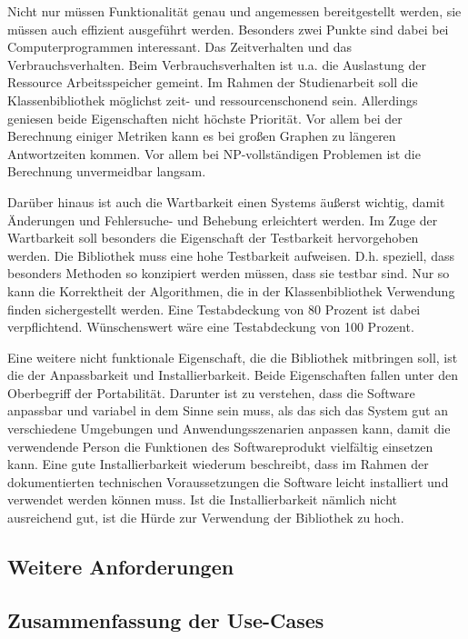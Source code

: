 \documentclass[a4paper,12pt,ngerman,chapterprefix=false,listof=totoc,bibliography=totoc]{scrreprt}
\begin{document}
{{{Nicht nur müssen Funktionalität genau und angemessen bereitgestellt werden, sie müssen auch effizient ausgeführt werden. Besonders zwei Punkte sind dabei bei Computerprogrammen interessant. Das Zeitverhalten und das Verbrauchsverhalten. Beim Verbrauchsverhalten ist u.a. die Auslastung der Ressource Arbeitsspeicher gemeint. Im Rahmen der Studienarbeit soll die Klassenbibliothek möglichst zeit- und ressourcenschonend sein. Allerdings geniesen beide Eigenschaften nicht höchste Priorität. Vor allem bei der Berechnung einiger Metriken kann es bei großen Graphen zu längeren Antwortzeiten kommen. Vor allem bei NP-vollständigen Problemen ist die Berechnung unvermeidbar langsam.

Darüber hinaus ist auch die Wartbarkeit einen Systems äußerst wichtig, damit Änderungen und Fehlersuche- und Behebung erleichtert werden. Im Zuge der Wartbarkeit soll besonders die Eigenschaft der Testbarkeit hervorgehoben werden. Die Bibliothek muss eine hohe Testbarkeit aufweisen. D.h. speziell, dass besonders Methoden so konzipiert werden müssen, dass sie testbar sind. Nur so kann die Korrektheit der Algorithmen, die in der Klassenbibliothek Verwendung finden sichergestellt werden. Eine Testabdeckung von 80 Prozent ist dabei verpflichtend. Wünschenswert wäre eine Testabdeckung von 100 Prozent.

Eine weitere nicht funktionale Eigenschaft, die die Bibliothek mitbringen soll, ist die der Anpassbarkeit und Installierbarkeit. Beide Eigenschaften fallen unter den Oberbegriff der Portabilität. Darunter ist zu verstehen, dass die Software anpassbar und variabel in dem Sinne sein muss, als das sich das System gut an verschiedene Umgebungen und Anwendungsszenarien anpassen kann, damit die verwendende Person die Funktionen des Softwareprodukt vielfältig einsetzen kann. Eine gute Installierbarkeit wiederum beschreibt, dass im Rahmen der dokumentierten technischen Voraussetzungen die Software leicht installiert und verwendet werden können muss. Ist die Installierbarkeit nämlich nicht ausreichend gut, ist die Hürde zur Verwendung der Bibliothek zu hoch. 
}
\subsection{Weitere Anforderungen}

\subsection{Zusammenfassung der Use-Cases}

}}
\end{document}
